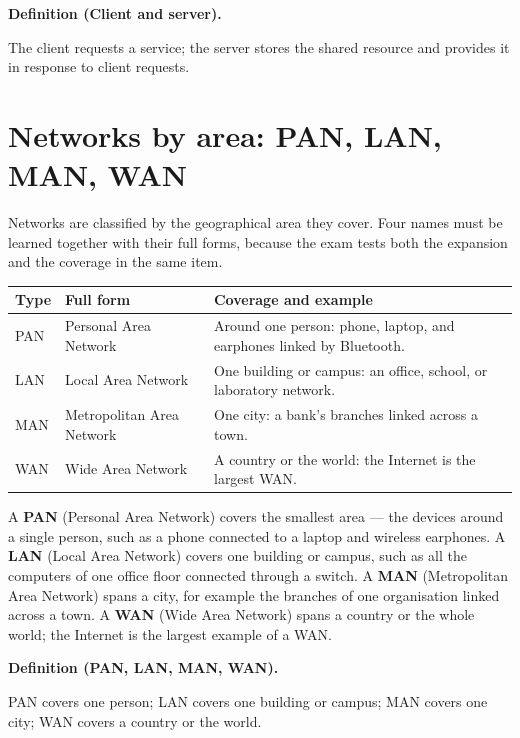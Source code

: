 \documentclass[11pt]{article}
\newenvironment{definitionbox}[1]{%
  \par\noindent\textbf{Definition (#1).}\ \itshape
}{\par\vspace{0.3em}}
\begin{document}
\begin{definitionbox}{Client and server}
The client requests a service; the server stores the shared resource and
provides it in response to client requests.
\end{definitionbox}

\section{Networks by area: PAN, LAN, MAN, WAN}
Networks are classified by the geographical area they cover. Four names must
be learned together with their full forms, because the exam tests both the
expansion and the coverage in the same item.

\begin{center}
\begin{tabular}{p{}p{}p{}}
\toprule
\textbf{Type} & \textbf{Full form} & \textbf{Coverage and example} \\
\midrule
PAN & Personal Area Network & Around one person: phone, laptop, and earphones linked by Bluetooth. \\
LAN & Local Area Network & One building or campus: an office, school, or laboratory network. \\
MAN & Metropolitan Area Network & One city: a bank's branches linked across a town. \\
WAN & Wide Area Network & A country or the world: the Internet is the largest WAN. \\
\bottomrule
\end{tabular}
\end{center}

A \textbf{PAN} (Personal Area Network) covers the smallest area --- the
devices around a single person, such as a phone connected to a laptop and
wireless earphones. A \textbf{LAN} (Local Area Network) covers one building
or campus, such as all the computers of one office floor connected through a
switch. A \textbf{MAN} (Metropolitan Area Network) spans a city, for example
the branches of one organisation linked across a town. A \textbf{WAN} (Wide
Area Network) spans a country or the whole world; the Internet is the largest
example of a WAN.

\begin{definitionbox}{PAN, LAN, MAN, WAN}
PAN covers one person; LAN covers one building or campus; MAN covers one
city; WAN covers a country or the world.
\end{definitionbox}
\end{document}
